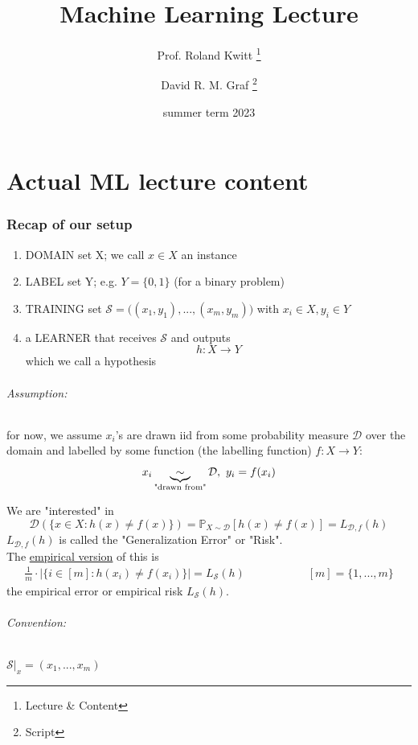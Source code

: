 \documentclass[10pt,a4paper]{article}
\title{Machine Learning Lecture}
\author{Prof. Roland Kwitt \thanks{Lecture \& Content} \and David R. M. Graf \thanks{Script}}
\date{summer term 2023}
\theoremstyle{definition}
\theoremstyle{plain}
\begin{document}
	\maketitle
\part{Actual ML lecture content}
\section*{Recap of our setup}
\begin{enumerate}
	\item DOMAIN set X; we call $x\in X$ an instance
	\item LABEL set Y; e.g. $Y = \{0, 1\}$ (for a binary problem)
	\item TRAINING set $\mathcal{S} = \big((x_1, y_1), ..., (x_m, y_m)\big)$  with $x_i \in X, y_i \in Y$
	\item a LEARNER that receives $\mathcal{S}$ and outputs 
	$$ h: X \to Y$$
	which we call a hypothesis
\end{enumerate}
\paragraph{Assumption:} for now, we assume $x_i$'s are drawn iid from some probability measure $\mathcal{D}$ over the domain and labelled by some function (the labelling function) $f: X \to Y$:
$$ x_i \underbrace{ \sim }_{\text{\scriptsize"drawn from"}} \mathcal{D},\ y_i = f(x_i)$$

We are "interested" in 
$$\mathcal{D}(\{x \in X: h(x) \neq f(x) \}) = \mathbb{P}_{X \sim \mathcal{D}}[h(x) \neq f(x)] = L_{\mathcal{D}, f}(h)$$
$L_{\mathcal{D}, f}(h)$ is called the "Generalization Error" or "Risk".\\
\newline
The \underline{empirical version} of this is 
\begin{align*}
	 \frac{1}{m}\cdot\bigg|\big\{ i \in [m]: h(x_i) \neq f(x_i) \big\}\bigg| = L_\mathcal{S}(h) & \hspace{2cm} [m] = \{1, ..., m\}
\end{align*}
the empirical error or empirical risk $L_\mathcal{S}(h)$.
\paragraph{Convention:}
$\mathcal{S}|_x = (x_1,..., x_m)$
\end{document}
